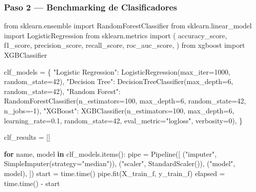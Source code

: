 \documentclass[
  letterpaper,
  DIV=11,
  numbers=noendperiod]{scrartcl}
\newenvironment{Shaded}{\begin{snugshade}}{\end{snugshade}}
\newcommand{\ControlFlowTok}[1]{\textcolor[rgb]{0.00,0.23,0.31}{\textbf{#1}}}
\newcommand{\DecValTok}[1]{\textcolor[rgb]{0.68,0.00,0.00}{#1}}
\newcommand{\FloatTok}[1]{\textcolor[rgb]{0.68,0.00,0.00}{#1}}
\newcommand{\ImportTok}[1]{\textcolor[rgb]{0.00,0.46,0.62}{#1}}
\newcommand{\KeywordTok}[1]{\textcolor[rgb]{0.00,0.23,0.31}{\textbf{#1}}}
\newcommand{\NormalTok}[1]{\textcolor[rgb]{0.00,0.23,0.31}{#1}}
\newcommand{\OperatorTok}[1]{\textcolor[rgb]{0.37,0.37,0.37}{#1}}
\newcommand{\StringTok}[1]{\textcolor[rgb]{0.13,0.47,0.30}{#1}}
\begin{document}
\subsubsection{Paso 2 --- Benchmarking de
Clasificadores}\label{paso-2-benchmarking-de-clasificadores}

\begin{Shaded}
\begin{Highlighting}[]
\ImportTok{from}\NormalTok{ sklearn.ensemble }\ImportTok{import}\NormalTok{ RandomForestClassifier}
\ImportTok{from}\NormalTok{ sklearn.linear\_model }\ImportTok{import}\NormalTok{ LogisticRegression}
\ImportTok{from}\NormalTok{ sklearn.metrics }\ImportTok{import}\NormalTok{ (}
\NormalTok{    accuracy\_score, f1\_score, precision\_score, recall\_score, roc\_auc\_score,}
\NormalTok{)}
\ImportTok{from}\NormalTok{ xgboost }\ImportTok{import}\NormalTok{ XGBClassifier}

\NormalTok{clf\_models }\OperatorTok{=}\NormalTok{ \{}
    \StringTok{"Logistic Regression"}\NormalTok{: LogisticRegression(max\_iter}\OperatorTok{=}\DecValTok{1000}\NormalTok{, random\_state}\OperatorTok{=}\DecValTok{42}\NormalTok{),}
    \StringTok{"Decision Tree"}\NormalTok{:       DecisionTreeClassifier(max\_depth}\OperatorTok{=}\DecValTok{6}\NormalTok{, random\_state}\OperatorTok{=}\DecValTok{42}\NormalTok{),}
    \StringTok{"Random Forest"}\NormalTok{:       RandomForestClassifier(n\_estimators}\OperatorTok{=}\DecValTok{100}\NormalTok{, max\_depth}\OperatorTok{=}\DecValTok{6}\NormalTok{,}
\NormalTok{                                                  random\_state}\OperatorTok{=}\DecValTok{42}\NormalTok{, n\_jobs}\OperatorTok{={-}}\DecValTok{1}\NormalTok{),}
    \StringTok{"XGBoost"}\NormalTok{:             XGBClassifier(n\_estimators}\OperatorTok{=}\DecValTok{100}\NormalTok{, max\_depth}\OperatorTok{=}\DecValTok{6}\NormalTok{,}
\NormalTok{                                         learning\_rate}\OperatorTok{=}\FloatTok{0.1}\NormalTok{, random\_state}\OperatorTok{=}\DecValTok{42}\NormalTok{,}
\NormalTok{                                         eval\_metric}\OperatorTok{=}\StringTok{"logloss"}\NormalTok{,}
\NormalTok{                                         verbosity}\OperatorTok{=}\DecValTok{0}\NormalTok{),}
\NormalTok{\}}

\NormalTok{clf\_results }\OperatorTok{=}\NormalTok{ []}

\ControlFlowTok{for}\NormalTok{ name, model }\KeywordTok{in}\NormalTok{ clf\_models.items():}
\NormalTok{    pipe }\OperatorTok{=}\NormalTok{ Pipeline([}
\NormalTok{        (}\StringTok{"imputer"}\NormalTok{, SimpleImputer(strategy}\OperatorTok{=}\StringTok{"median"}\NormalTok{)),}
\NormalTok{        (}\StringTok{"scaler"}\NormalTok{,  StandardScaler()),}
\NormalTok{        (}\StringTok{"model"}\NormalTok{,   model),}
\NormalTok{    ])}
\NormalTok{    start }\OperatorTok{=}\NormalTok{ time.time()}
\NormalTok{    pipe.fit(X\_train\_f, y\_train\_f)}
\NormalTok{    elapsed }\OperatorTok{=}\NormalTok{ time.time() }\OperatorTok{{-}}\NormalTok{ start}


\end{Highlighting}
\end{Shaded}
\end{document}

